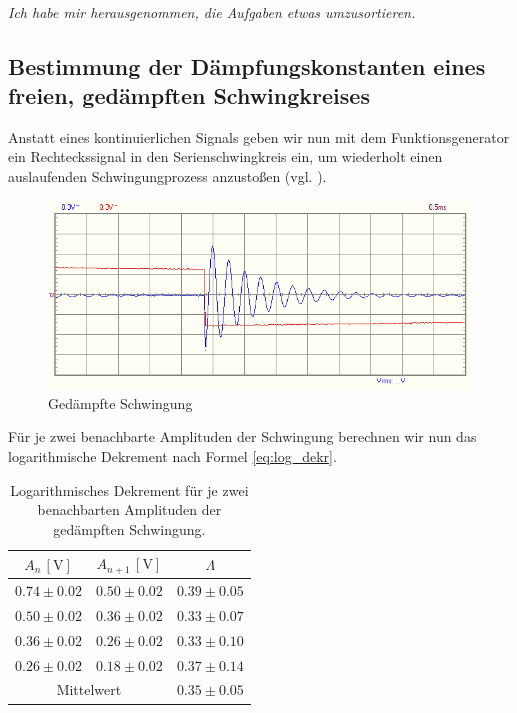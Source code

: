 \\

\textit{Ich habe mir herausgenommen, die Aufgaben etwas umzusortieren.}

\subsection{Bestimmung der Dämpfungskonstanten eines freien, gedämpften Schwingkreises}

Anstatt eines kontinuierlichen Signals geben wir nun mit dem Funktionsgenerator ein Rechteckssignal in den Serienschwingkreis ein, um wiederholt einen auslaufenden Schwingungprozess anzustoßen (vgl. ).

\begin{figure}[H]
  \centering
  \includegraphics[width=.8\textwidth]{files/aufgabe6_schwingung_gedaempft.png}
  \caption{Gedämpfte Schwingung}
  \label{fig:aufgabe6_schwingung_gedaempft}
\end{figure}

Für je zwei benachbarte Amplituden der Schwingung berechnen wir nun das logarithmische Dekrement nach Formel \eqref{eq:log_dekr}.

\renewcommand{\arraystretch}{1.5}
\begin{table}
  \centering
  \caption{Logarithmisches Dekrement für je zwei benachbarten Amplituden der gedämpften Schwingung.}
  \begin{tabular}{c|c|c}
    $A_n\,[\si{\volt}]$ & $A_{n+1}\,[\si{\volt}]$ & $\Lambda$\\\hline
    $0.74 \pm 0.02$ & $0.50 \pm 0.02$ &	$0.39 \pm 0.05 $\\
    $0.50 \pm 0.02$ & $0.36 \pm 0.02$ &	$0.33 \pm 0.07 $\\
    $0.36 \pm 0.02$ & $0.26 \pm 0.02$ &	$0.33 \pm 0.10 $\\
    $0.26 \pm 0.02$ & $0.18 \pm 0.02$ &	$0.37 \pm 0.14 $\\
    \hline\hline
    \multicolumn{2}{c}{Mittelwert} & $0.35 \pm 0.05$\\\hline
  \end{tabular}
\end{table}
\renewcommand{\arraystretch}{1}

